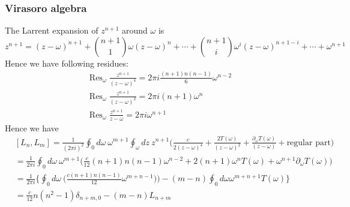 \documentclass[11pt,a4paper]{article}
\theoremstyle{definition}
\DeclareMathOperator{\res}{Res}
\begin{document}
\subsubsection{Virasoro algebra}
The Larrent expansion of $z^{n+1}$ around $\omega$ is 
\[
z^{n+1}= (z- \omega)^{n+1} + \binom{n+1}{1} \omega (z-\omega)^n + \cdots + \binom{n+1}{i}\omega^i (z-\omega)^{n+1 -i} +\cdots + \omega^{n+1}
\]
 Hence we have following residues:
 \[
 \begin{aligned}
 &\res_{\omega} \frac{z^{n+1}}{(z-\omega)^4}= 2 \pi i \frac{(n+1)n(n-1)}{6} \omega^{n-2}\\ 
&\res_{\omega} \frac{z^{n+1}}{(z-\omega)^2}= 2 \pi i (n+1) \omega^n\\
&\res_{\omega} \frac{z^{n+1}}{z-\omega}= 2 \pi i \omega^{n+1}
 \end{aligned}
 \]
  Hence we have 
  \[
  \begin{aligned}
  &[L_n, L_m] = \frac{1}{(2 \pi i )^2} \oint_0 d \omega\ \omega^{m+1} \oint_\omega dz\ z^{n+1} \big(\frac{c}{2(z-\omega)^4} + \frac{2T(\omega)}{(z-\omega)^2} + \frac{\partial_\omega T(\omega)}{(z-\omega)} + \text{regular part}\big)\\
  &= \frac{1}{2 \pi i} \oint_0 d\omega\ \omega^{m+1} \big( \frac{c}{12}(n+1)n(n-1) \omega^{n-2} + 2(n+1) \omega ^n T(\omega) + \omega^{n+1} \partial_{\omega} T(\omega) \big)&\\
 &= \frac{1}{2 \pi i} \Big\{\oint_0 d\omega\ \Big( \frac{c(n+1) n(n-1)}{12} \omega^{m+n-1} )\Big) - (m-n) \oint_0 d\omega \omega^{m+n +1 } T(\omega) \Big\}&\\
 &= \frac{c}{12} n (n^2-1) \delta_{n+m,0} - (m-n) L_{n+m}
  \end{aligned}
  \]
\end{document}
